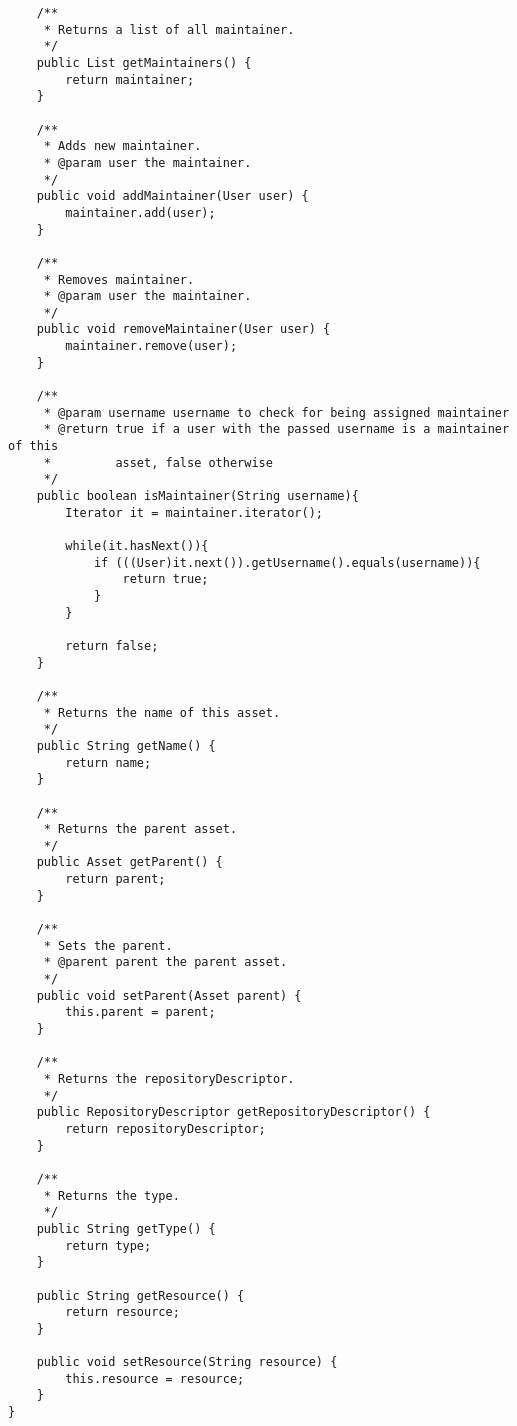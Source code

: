 \begin{verbatim}
	/**
	 * Returns a list of all maintainer.
	 */
	public List getMaintainers() {
		return maintainer;
	}
	
	/**
	 * Adds new maintainer.
	 * @param user the maintainer.
	 */
	public void addMaintainer(User user) {
		maintainer.add(user);
	}
	
	/**
	 * Removes maintainer.
	 * @param user the maintainer.
	 */
	public void removeMaintainer(User user) {
		maintainer.remove(user);
	}
    
    /**
     * @param username username to check for being assigned maintainer 
     * @return true if a user with the passed username is a maintainer of this
     *         asset, false otherwise
     */
    public boolean isMaintainer(String username){
        Iterator it = maintainer.iterator();
        
        while(it.hasNext()){
            if (((User)it.next()).getUsername().equals(username)){
                return true;
            }
        }
        
        return false;
    }
	
	/**
	 * Returns the name of this asset.
	 */
	public String getName() {
		return name;
	}
	
	/**
	 * Returns the parent asset.
	 */
	public Asset getParent() {
		return parent;
	}
	
	/**
	 * Sets the parent.
	 * @parent parent the parent asset.
	 */
	public void setParent(Asset parent) {
		this.parent = parent;
	}
	
	/**
	 * Returns the repositoryDescriptor.
	 */
	public RepositoryDescriptor getRepositoryDescriptor() {
		return repositoryDescriptor;
	}
	
	/**
	 * Returns the type.
	 */
	public String getType() {
		return type;
	}
	
    public String getResource() {
        return resource;
    }
    
    public void setResource(String resource) {
        this.resource = resource;
    }
}
\end{verbatim}
